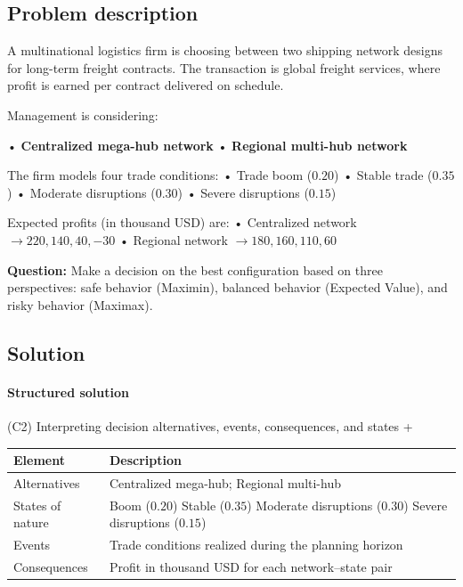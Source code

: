\documentclass[11pt]{article}
\begin{document}
	
	\subsection*{Problem description}
	
	\hypertarget{problem3-problem}{}
	
	A multinational logistics firm is choosing between two shipping network designs for long-term freight contracts. The
	transaction is global freight services, where profit is earned per contract delivered on schedule.
	
	
	
	
	
	
	Management is considering:
	
	
	
	
	
	
	• \textbf{Centralized mega-hub network}
	• \textbf{Regional multi-hub network}
	
	
	
	
	The firm models four trade conditions:
	• Trade boom ($0.20$)
	• Stable trade ($0.35$)
	• Moderate disruptions ($0.30$)
	• Severe disruptions ($0.15$)
	
	
	
	
	
	
	Expected profits (in thousand USD) are:
	• Centralized network $\to 220, 140, 40, -30$
	• Regional network $\to 180, 160, 110, 60$
	
	
	
	
	
	\textbf{Question:} Make a decision on the best configuration based on three perspectives:
	safe behavior (Maximin), balanced behavior (Expected Value), and risky behavior (Maximax).
	
	\subsection*{Solution}
	
	\hypertarget{problem3-solution}{}
	
	\paragraph{Structured solution}
	
	
	(C2) Interpreting decision alternatives, events, consequences, and states
	+
	
	
	\begin{center}
		\begin{tabular}{ll}
			\toprule
			Element & Description \\
			\midrule
			Alternatives & Centralized mega-hub; Regional multi-hub \\
			States of nature & Boom
			($0.20$)
			Stable
			($0.35$)
			Moderate disruptions
			($0.30$)
			Severe disruptions
			($0.15$) \\
			Events & Trade conditions realized during the planning horizon \\
			Consequences & Profit in thousand USD for each network–state pair \\
			\bottomrule
		\end{tabular}
	\end{center}
	
\end{document}
